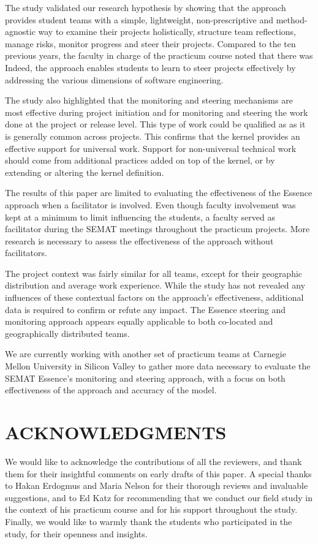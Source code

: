 The study validated our research hypothesis by showing that the approach provides student teams with a simple, lightweight, non-prescriptive and method-agnostic way to examine their projects holistically, structure team reflections, manage risks, monitor progress and steer their projects. Compared to the ten previous years, the faculty in charge of the practicum course noted that there was  Indeed, the approach enables students to learn to steer projects effectively by addressing the various dimensions of software engineering.

The study also highlighted that the monitoring and steering mechanisms are most effective during project initiation and for monitoring and steering the work done at the project or release level. This type of work could be qualified as  as it is generally common across projects. This confirms that the kernel provides an effective support for universal work. Support for non-universal technical work should come from additional practices added on top of the kernel, or by extending or altering the kernel definition.

The results of this paper are limited to evaluating the effectiveness of the Essence approach when a facilitator is involved. Even though faculty involvement was kept at a minimum to limit influencing the students, a faculty served as facilitator during the SEMAT meetings throughout the practicum projects. More research is necessary to assess the effectiveness of the approach without facilitators.

The project context was fairly similar for all teams, except for their geographic distribution and average work experience. While the study has not revealed any influences of these contextual factors on the approach's effectiveness, additional data is required to confirm or refute any impact. The Essence steering and monitoring approach appears equally applicable to both co-located and geographically distributed teams.

We are currently working with another set of practicum teams at Carnegie Mellon University in Silicon Valley to gather more data necessary to evaluate the SEMAT Essence's monitoring and steering approach, with a focus on both effectiveness of the approach and accuracy of the model.

\section{ACKNOWLEDGMENTS}
We would like to acknowledge the contributions of all the reviewers, and thank them for their insightful comments on early drafts of this paper. A special thanks to Hakan Erdogmus and Maria Nelson for their thorough reviews and invaluable suggestions, and to Ed Katz for recommending that we conduct our field study in the context of his practicum course and for his support throughout the study. Finally, we would like to warmly thank the students who participated in the study, for their openness and insights.

